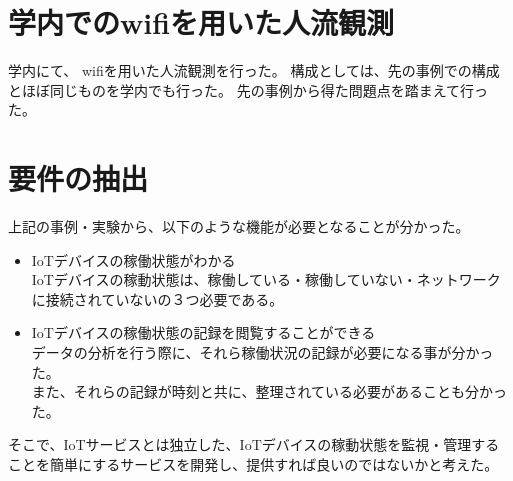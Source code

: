 \section{学内でのwifiを用いた人流観測}
学内にて、
wifiを用いた人流観測を行った。
構成としては、先の事例での構成とほぼ同じものを学内でも行った。
先の事例から得た問題点を踏まえて行った。




\section{要件の抽出}
上記の事例・実験から、以下のような機能が必要となることが分かった。

\begin{itemize}
\item IoTデバイスの稼働状態がわかる\\
	IoTデバイスの稼動状態は、稼働している・稼働していない・ネットワークに接続されていないの３つ必要である。
\item IoTデバイスの稼働状態の記録を閲覧することができる\\
	データの分析を行う際に、それら稼働状況の記録が必要になる事が分かった。\\
	また、それらの記録が時刻と共に、整理されている必要があることも分かった。
\end{itemize}

そこで、IoTサービスとは独立した、IoTデバイスの稼動状態を監視・管理することを簡単にするサービスを開発し、提供すれば良いのではないかと考えた。




